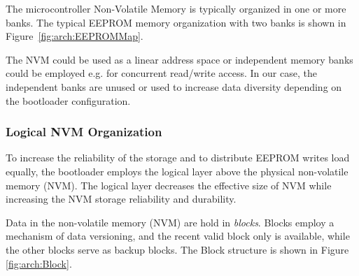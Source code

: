 The microcontroller Non-Volatile Memory is typically organized in one or more banks.
The typical EEPROM memory organization with two banks is shown in Figure~\ref{fig:arch:EEPROMMap}.



The NVM could be used as a linear address space or independent memory banks could be employed e.g. for concurrent read/write access.
In our case, the independent banks are unused or used to increase data diversity depending on the bootloader configuration. 

\subsubsection{Logical NVM Organization}\label{sec:arch:EEPROMMap:logical}

To increase the reliability of the storage and to distribute EEPROM writes load equally, the bootloader employs the logical layer above the physical non-volatile memory (NVM). 
The logical layer decreases the effective size of NVM while increasing the NVM storage reliability and durability. 

Data in the non-volatile memory (NVM) are hold in \textit{blocks}. Blocks employ a mechanism of data versioning, 
and the recent valid block only is available, while the other blocks serve as backup blocks. The Block structure is shown in Figure \ref{fig:arch:Block}. 

